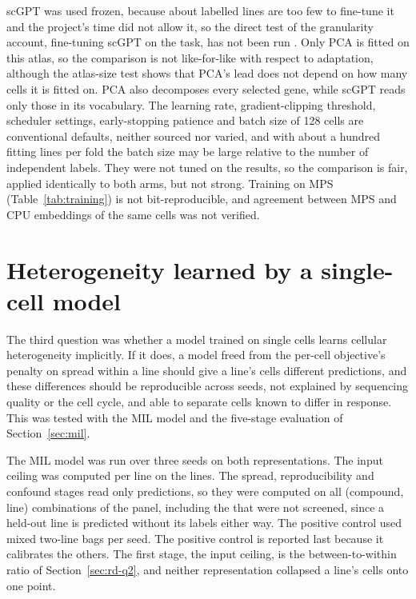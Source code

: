scGPT was used frozen, because about \NLinesCV{} labelled lines are too few to fine-tune it and the
project's time did not allow it, so the direct test of the granularity account, fine-tuning scGPT on the
task, has not been run \cite{scgpt}. Only PCA is fitted on this atlas, so the comparison is not
like-for-like with respect to adaptation, although the atlas-size test shows that PCA's lead does not
depend on how many cells it is fitted on. PCA also decomposes every selected gene, while scGPT reads only
those in its vocabulary. The learning rate, gradient-clipping threshold, scheduler settings,
early-stopping patience and batch size of 128 cells are conventional defaults, neither sourced nor
varied, and with about a hundred fitting lines per fold the batch size may be large relative to the
number of independent labels. They were not tuned on the results, so the comparison is fair, applied
identically to both arms, but not strong. Training on MPS (Table~\ref{tab:training}) is not
bit-reproducible, and agreement between MPS and CPU embeddings of the same cells was not verified.

\section{Heterogeneity learned by a single-cell model}
\label{sec:results-q3}
\label{sec:rd-q3}

The third question was whether a model trained on single cells learns cellular heterogeneity implicitly.
If it does, a model freed from the per-cell objective's penalty on spread within a line should give a
line's cells different predictions, and these differences should be reproducible across seeds, not
explained by sequencing quality or the cell cycle, and able to separate cells known to differ in response.
This was tested with the MIL model and the five-stage evaluation of Section~\ref{sec:mil}.

The MIL model \cite{dietterich1997,ilse2018} was run over three seeds on both representations. The input ceiling was computed per line on the
\NLinesCV{} lines. The spread, reproducibility and confound stages read only predictions, so they were
computed on all \QPairs{} (compound, line) combinations of the panel, including the \QUnscreened{} that
were not screened, since a held-out line is predicted without its labels either way. The positive control
used \QBags{} mixed two-line bags per seed.
The positive control is reported last because it calibrates the others. The first stage,
the input ceiling, is the between-to-within ratio of Section~\ref{sec:rd-q2}, and neither representation
collapsed a line's cells onto one point.

